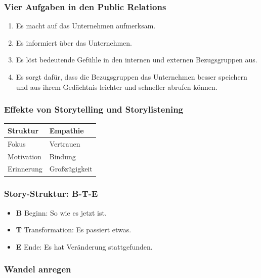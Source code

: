 \documentclass[12pt, a4paper]{article}
\begin{document}
\subsubsection{Vier Aufgaben in den Public Relations}

\begin{enumerate}
  \item Es macht auf das Unternehmen aufmerksam.
  \item Es informiert über das Unternehmen.
  \item Es löst bedeutende Gefühle in den internen und externen
        Bezugsgruppen aus.
  \item Es sorgt dafür, dass die Bezugsgruppen das Unternehmen besser
        speichern und aus ihrem Gedächtnis leichter und schneller abrufen
        können.
\end{enumerate}

\subsubsection{Effekte von Storytelling und Storylistening}

\begin{center}
\begin{tabular}{ll}
\textbf{Struktur} & \textbf{Empathie}\\\hline
Fokus & Vertrauen\\
Motivation & Bindung\\
Erinnerung & Großzügigkeit\\
\end{tabular}
\end{center}

\subsubsection{Story-Struktur: B-T-E}

\begin{itemize}
  \item \textbf{B} Beginn: \glqq So wie es jetzt ist.\grqq{}
  \item \textbf{T} Transformation: \glqq Es passiert etwas.\grqq{}
  \item \textbf{E} Ende: \glqq Es hat Veränderung stattgefunden.\grqq{}
\end{itemize}

\subsubsection{Wandel anregen}
\end{document}
